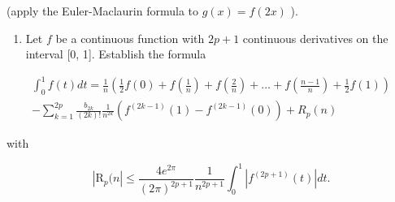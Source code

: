 (apply the Euler-Maclaurin formula to \(g(x) = f(2x)\) ).

\begin{enumerate}
\def\labelenumi{\arabic{enumi})}
\setcounter{enumi}{2}
\tightlist
\item
  Let \(f\) be a continuous function with \(2p + 1\) continuous derivatives on the interval {[}0, 1{]}. Establish the formula
\end{enumerate}

\[
\begin{array}{l} \int_ {0} ^ {1} f (t) d t = \frac {1}{n} \left(\frac {1}{2} f (0) + f \left(\frac {1}{n}\right) + f \left(\frac {2}{n}\right) + \dots + f \left(\frac {n - 1}{n}\right) + \frac {1}{2} f (1)\right) \\ - \sum_ {k = 1} ^ {2 p} \frac {b _ {2 k}}{(2 k) !} \frac {1}{n ^ {2 k}} (f ^ {(2 k - 1)} (1) - f ^ {(2 k - 1)} (0)) + R _ {p} (n) \end{array}
\]

with

\[
\left| \mathrm{R} _ {p} (n \right| \leqslant \frac {4 e ^ {2 \pi}}{(2 \pi) ^ {2 p + 1}} \frac {1}{n ^ {2 p + 1}} \int_ {0} ^ {1} \left| f ^ {(2 p + 1)} (t) \right| d t.
\]

